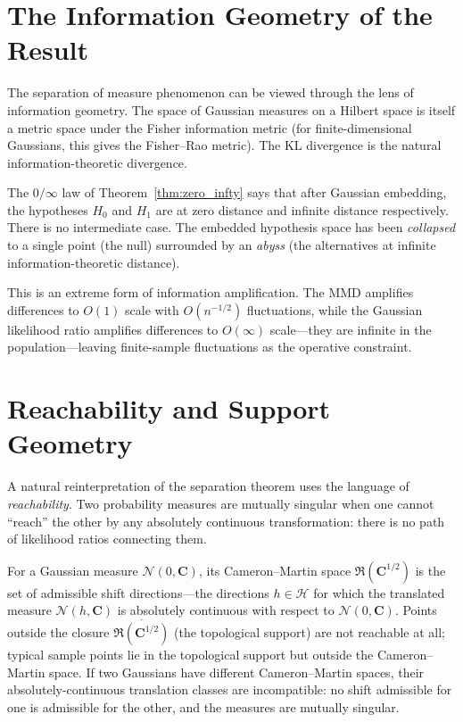 \documentclass[12pt, oneside]{book}
\theoremstyle{plain}
\theoremstyle{definition}
\newcommand{\calH}{\mathcal{H}}
\newcommand{\calN}{\mathcal{N}}
\newcommand{\ran}{\mathfrak{R}}
\begin{document}
\section{The Information Geometry of the Result}

The separation of measure phenomenon can be viewed through the lens of information geometry. The space of Gaussian measures on a Hilbert space is itself a metric space under the Fisher information metric (for finite-dimensional Gaussians, this gives the Fisher--Rao metric). The KL divergence is the natural information-theoretic divergence.

The $0/\infty$ law of Theorem~\ref{thm:zero_infty} says that after Gaussian embedding, the hypotheses $H_0$ and $H_1$ are at zero distance and infinite distance respectively. There is no intermediate case. The embedded hypothesis space has been \emph{collapsed} to a single point (the null) surrounded by an \emph{abyss} (the alternatives at infinite information-theoretic distance).

This is an extreme form of information amplification. The MMD amplifies differences to $O(1)$ scale with $O(n^{-1/2})$ fluctuations, while the Gaussian likelihood ratio amplifies differences to $O(\infty)$ scale---they are infinite in the population---leaving finite-sample fluctuations as the operative constraint.

\section{Reachability and Support Geometry}

A natural reinterpretation of the separation theorem uses the language of \emph{reachability}. Two probability measures are mutually singular when one cannot ``reach'' the other by any absolutely continuous transformation: there is no path of likelihood ratios connecting them.

For a Gaussian measure $\calN(0, \mathbf{C})$, its Cameron--Martin space $\ran(\mathbf{C}^{1/2})$ is the set of admissible shift directions---the directions $h \in \calH$ for which the translated measure $\calN(h, \mathbf{C})$ is absolutely continuous with respect to $\calN(0, \mathbf{C})$. Points outside the closure $\overline{\ran(\mathbf{C}^{1/2})}$ (the topological support) are not reachable at all; typical sample points lie in the topological support but outside the Cameron--Martin space. If two Gaussians have different Cameron--Martin spaces, their absolutely-continuous translation classes are incompatible: no shift admissible for one is admissible for the other, and the measures are mutually singular.
\end{document}
